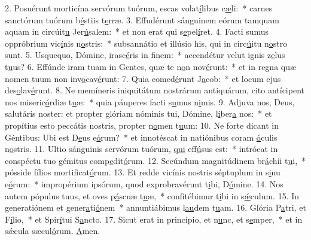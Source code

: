 2. Posuérunt morticína servórum tuórum, escas volat\uline{í}libus c\uline{æ}li:~* carnes sanctórum tuórum b\uline{é}stiis t\uline{e}rræ.
3. Effudérunt sánguinem eórum tamquam aquam in circúit\uline{u} Jer\uline{ú}salem:~* et non erat qui s\uline{e}pel\uline{í}ret.
4. Facti sumus oppróbrium vic\uline{í}nis n\uline{o}stris:~* subsannátio et illúsio his, qui in circ\uline{ú}itu n\uline{o}stro sunt.
5. Usquequo, Dómine, irasc\uline{é}ris in f\uline{i}nem:~* accendétur velut ignis z\uline{e}lus t\uline{u}us?
6. Effúnde iram tuam in Gentes, quæ te n\uline{o}n nov\uline{é}runt:~* et in regna quæ nomen tuum non inv\uline{o}cav\uline{é}runt:
7. Quia comed\uline{é}runt J\uline{a}cob:~* et locum ejus des\uline{o}lav\uline{é}runt.
8. Ne memíneris iniquitátum nostrárum antiquárum, cito antícipent nos miseric\uline{ó}rdiæ t\uline{u}æ:~* quia páuperes facti s\uline{u}mus n\uline{i}mis.
9. Adjuva nos, Deus, salutáris noster: et propter glóriam nóminis tui, Dómine, l\uline{í}ber\uline{a} nos:~* et propítius esto peccátis nostris, propter n\uline{o}men t\uline{u}um:
10. Ne forte dicant in Géntibus: Ubi est D\uline{e}us e\uline{ó}rum?~* et innotéscat in natiónibus coram \uline{ó}culis n\uline{o}stris.
11. Ultio sánguinis servórum tuórum, \uline{qui} eff\uline{ú}sus est:~* intróeat in conspéctu tuo gémitus comp\uline{e}dit\uline{ó}rum.
12. Secúndum magnitúdinem br\uline{á}chii t\uline{u}i,~* pósside fílios mortif\uline{i}cat\uline{ó}rum.
13. Et redde vicínis nostris séptuplum in s\uline{i}nu e\uline{ó}rum:~* impropérium ipsórum, quod exprobravérunt t\uline{i}bi, D\uline{ó}mine.
14. Nos autem pópulus tuus, et oves p\uline{á}scuæ t\uline{u}æ,~* confitébimur t\uline{i}bi in s\uline{ǽ}culum.
15. In generatiónem et gener\uline{a}ti\uline{ó}nem~* annuntiábimus l\uline{au}dem t\uline{u}am.
16. Glória P\uline{a}tri, et F\uline{í}lio,~* et Spir\uline{í}tui S\uline{a}ncto.
17. Sicut erat in princípio, et n\uline{u}nc, et s\uline{e}mper,~* et in sǽcula sæcul\uline{ó}rum. \uline{A}men.
